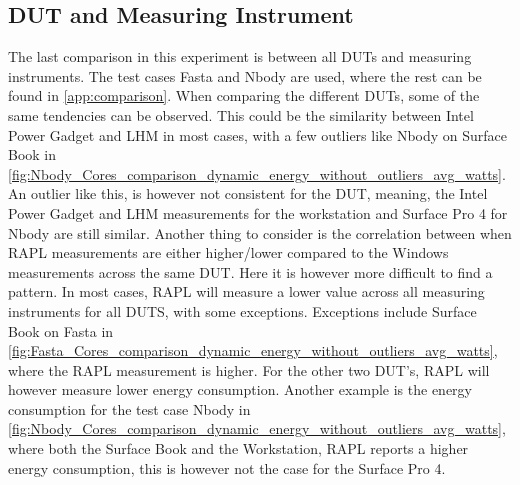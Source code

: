 \subsection{DUT and Measuring Instrument}




The last comparison in this experiment is between all DUTs and measuring instruments. The test cases Fasta and Nbody are used, where the rest can be found in \cref{app:comparison}. When comparing the different DUTs, some of the same tendencies can be observed. This could be the similarity between Intel Power Gadget and LHM in most cases, with a few outliers like Nbody on Surface Book in \cref{fig:Nbody_Cores_comparison_dynamic_energy_without_outliers_avg_watts}. An outlier like this, is however not consistent for the DUT, meaning, the Intel Power Gadget and LHM measurements for the workstation and Surface Pro 4 for Nbody are still similar. Another thing to consider is the correlation between when RAPL measurements are either higher/lower compared to the Windows measurements across the same DUT. Here it is however more difficult to find a pattern. In most cases, RAPL will measure a lower value across all measuring instruments for all DUTS, with some exceptions. Exceptions include Surface Book on Fasta in \cref{fig:Fasta_Cores_comparison_dynamic_energy_without_outliers_avg_watts}, where the RAPL measurement is higher. For the other two DUT's, RAPL will however measure lower energy consumption. Another example is the energy consumption for the test case Nbody in \cref{fig:Nbody_Cores_comparison_dynamic_energy_without_outliers_avg_watts}, where both the Surface Book and the Workstation, RAPL reports a higher energy consumption, this is however not the case for the Surface Pro 4.

